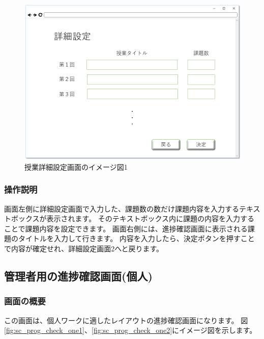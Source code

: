 \begin{figure}[htbp]
\begin{center}
  \includegraphics[width=1\linewidth,clip]{./img/sc_class_detail1.png}
  \caption{授業詳細設定画面のイメージ図1}\label{fig:sc_class_detail1}
\end{center}
\end{figure}

\subsubsection{操作説明}
画面左側に詳細設定画面で入力した、課題数の数だけ課題内容を入力するテキストボックスが表示されます。
そのテキストボックス内に課題の内容を入力することで課題内容を設定できます。
画面右側には、進捗確認画面に表示される課題のタイトルを入力して行きます。
内容を入力したら、決定ボタンを押すことで内容が確定せれ、詳細設定画面2へと戻ります。

\newpage

\subsection{管理者用の進捗確認画面(個人)}
\subsubsection{画面の概要}
この画面は、個人ワークに適したレイアウトの進捗確認画面になります。
図\ref{fig:sc_prog_check_one1}、\ref{fig:sc_prog_check_one2}にイメージ図を示します。

